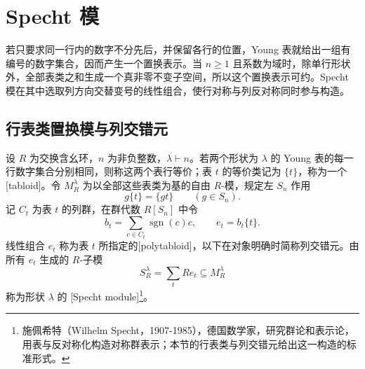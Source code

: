 \section{Specht 模}
\label{b5:sec:0602}

若只要求同一行内的数字不分先后，并保留各行的位置，Young 表就给出一组有编号的数字集合，因而产生一个置换表示。当 \(n\ge1\) 且系数为域时，除单行形状外，全部表类之和生成一个真非零不变子空间，所以这个置换表示可约。Specht 模在其中选取列方向交替变号的线性组合，使行对称与列反对称同时参与构造。

\subsection{行表类置换模与列交错元}
\label{b5:subsec:0602:01}

\begin{definition}\label{b5:def:specht-module}
	设 \(R\) 为交换含幺环，\(n\) 为非负整数，\(\lambda\vdash n\)。若两个形状为 \(\lambda\) 的 Young 表的每一行数字集合分别相同，则称这两个表行等价；表 \(t\) 的等价类记为 \(\{t\}\)，称为一个[tabloid]。令 \(M_R^\lambda\) 为以全部这些表类为基的自由 \(R\)-模，规定左 \(S_n\) 作用
	\[
		g\{t\}=\{gt\}\qquad(g\in S_n).
	\]
	记 \(C_t\) 为表 \(t\) 的列群，在群代数 \(R[S_n]\) 中令
	\[
		b_t=\sum_{c\in C_t}\operatorname{sgn}(c)c,\qquad e_t=b_t\{t\}.
	\]
	线性组合 \(e_t\) 称为表 \(t\) 所指定的[polytabloid]，以下在对象明确时简称列交错元。由所有 \(e_t\) 生成的 \(R\)-子模
	\[
		S_R^\lambda=\sum_t R e_t\subseteq M_R^\lambda
	\]
	称为形状 \(\lambda\) 的 [Specht module]\footnote{施佩希特（Wilhelm Specht，1907-1985），德国数学家，研究群论和表示论，用表与反对称化构造对称群表示；本节的行表类与列交错元给出这一构造的标准形式。}。
\end{definition}

